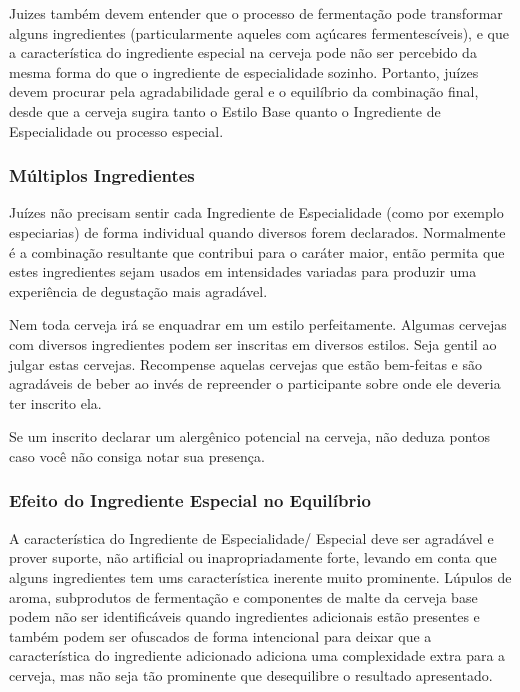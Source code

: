 Juizes também devem entender que o processo de fermentação pode transformar alguns ingredientes (particularmente aqueles com açúcares fermentescíveis), e que a característica do ingrediente especial na cerveja pode não ser percebido da mesma forma do que o ingrediente de especialidade sozinho. Portanto, juízes devem procurar pela agradabilidade geral e o equilíbrio da combinação final, desde que a cerveja sugira tanto o Estilo Base quanto o Ingrediente de Especialidade ou processo especial.

\subsubsection*{Múltiplos Ingredientes}
Juízes não precisam sentir cada Ingrediente de Especialidade (como por exemplo especiarias) de forma individual quando diversos forem declarados. Normalmente é a combinação resultante que contribui para o caráter maior, então permita que estes ingredientes sejam usados em intensidades variadas para produzir uma experiência de degustação mais agradável.

Nem toda cerveja irá se enquadrar em um estilo perfeitamente. Algumas cervejas com diversos ingredientes podem ser inscritas em diversos estilos. Seja gentil ao julgar estas cervejas. Recompense aquelas cervejas que estão bem-feitas e são agradáveis de beber ao invés de repreender o participante sobre onde ele deveria ter inscrito ela.

Se um inscrito declarar um alergênico potencial na cerveja, não deduza pontos caso você não consiga notar sua presença.

\subsubsection*{Efeito do Ingrediente Especial no Equilíbrio}
A característica do Ingrediente de Especialidade/ Especial deve ser agradável e prover suporte, não artificial ou inapropriadamente forte, levando em conta que alguns ingredientes tem ums característica inerente muito prominente.  Lúpulos de aroma, subprodutos de fermentação e componentes de malte da cerveja base podem não ser identificáveis quando ingredientes adicionais estão presentes e também podem ser ofuscados de forma intencional para deixar que a característica do ingrediente adicionado adiciona uma complexidade extra para a cerveja, mas não seja tão prominente que desequilibre o resultado apresentado.